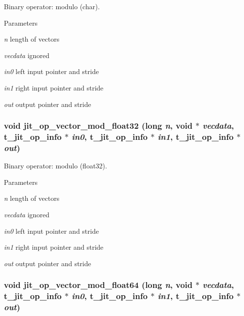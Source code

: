 Binary operator: modulo (char). 
\begin{DoxyParams}{Parameters}
\item[{\em n}]length of vectors \item[{\em vecdata}]ignored \item[{\em in0}]left input pointer and stride \item[{\em in1}]right input pointer and stride \item[{\em out}]output pointer and stride \end{DoxyParams}
\hypertarget{group__opvecmod_gaebb1d0ab45373a92e749098f681e0b79}{
\subsubsection[{jit\_\-op\_\-vector\_\-mod\_\-float32}]{\setlength{\rightskip}{0pt plus 5cm}void jit\_\-op\_\-vector\_\-mod\_\-float32 (long {\em n}, \/  void $\ast$ {\em vecdata}, \/  {\bf t\_\-jit\_\-op\_\-info} $\ast$ {\em in0}, \/  {\bf t\_\-jit\_\-op\_\-info} $\ast$ {\em in1}, \/  {\bf t\_\-jit\_\-op\_\-info} $\ast$ {\em out})}}
\label{group__opvecmod_gaebb1d0ab45373a92e749098f681e0b79}


Binary operator: modulo (float32). 
\begin{DoxyParams}{Parameters}
\item[{\em n}]length of vectors \item[{\em vecdata}]ignored \item[{\em in0}]left input pointer and stride \item[{\em in1}]right input pointer and stride \item[{\em out}]output pointer and stride \end{DoxyParams}
\hypertarget{group__opvecmod_gabd1f654ed99061d886bd768c80493a54}{
\subsubsection[{jit\_\-op\_\-vector\_\-mod\_\-float64}]{\setlength{\rightskip}{0pt plus 5cm}void jit\_\-op\_\-vector\_\-mod\_\-float64 (long {\em n}, \/  void $\ast$ {\em vecdata}, \/  {\bf t\_\-jit\_\-op\_\-info} $\ast$ {\em in0}, \/  {\bf t\_\-jit\_\-op\_\-info} $\ast$ {\em in1}, \/  {\bf t\_\-jit\_\-op\_\-info} $\ast$ {\em out})}}
\label{group__opvecmod_gabd1f654ed99061d886bd768c80493a54}


